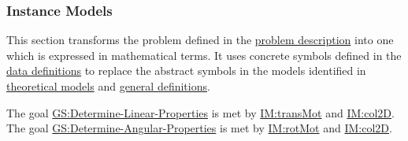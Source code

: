 \documentclass[12pt]{article}
\begin{document}
\subsubsection{Instance Models}
\label{Sec:IMs}
This section transforms the problem defined in the \hyperref[Sec:ProbDesc]{problem description} into one which is expressed in mathematical terms. It uses concrete symbols defined in the \hyperref[Sec:DDs]{data definitions} to replace the abstract symbols in the models identified in \hyperref[Sec:TMs]{theoretical models} and \hyperref[Sec:GDs]{general definitions}.

The goal \hyperref[linearGS]{GS:Determine-Linear-Properties} is met by \hyperref[IM:transMot]{IM:transMot} and \hyperref[IM:col2D]{IM:col2D}. The goal \hyperref[angularGS]{GS:Determine-Angular-Properties} is met by \hyperref[IM:rotMot]{IM:rotMot} and \hyperref[IM:col2D]{IM:col2D}.
\end{document}
